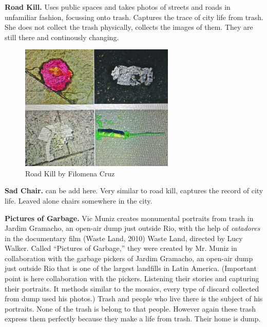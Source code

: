 %
\textbf{Road Kill.}  Uses public spaces and takes photos of streets and roads in unfamiliar fashion, focussing onto trash. Captures the trace of city life from trash. She does not collect the trash physically, collects the images of them. They are still there and continously changing.

\begin{figure}[h!]
  \centering
  \includegraphics[height=6cm]{graphics/FilomenaCruz_RoadKill_ReVista.jpg}
  \caption{Road Kill by Filomena Cruz}
  \label{fig:FilomenaCruz_RoadKill_ReVista}
\end{figure}






%
%
\textbf{Sad Chair.} can be add here. Very similar to road kill, captures the record of city life. Leaved alone chairs somewhere in the city. 





%
%
\textbf{Pictures of Garbage.} Vic Muniz creates monumental portraits from trash in Jardim Gramacho, an open-air dump just outside Rio, with the help of \textit{catadores} in the documentary film (Waste Land, 2010) Waste Land, directed by Lucy Walker. Called “Pictures of Garbage,” they were created by Mr. Muniz in collaboration with the garbage pickers of Jardim Gramacho, an open-air dump just outside Rio that is one of the largest landfills in Latin America. (Important point is here collaboration with the pickers. Listening their stories and capturing their portraits. It methods similar to the mosaics, every type of discard collected from dump used his photos.) Trash and people who live there is the subject of his portraits. None of the trash is belong to that people. However again these trash express them perfectly because they make a life from trash. Their home is dump.

